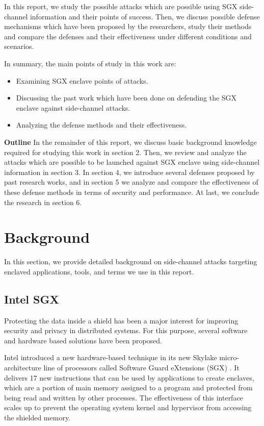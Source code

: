 In this report, we study the possible attacks which are possible using SGX side-channel information and their points of success. Then, we discuss possible defense mechanisms which have been proposed by the researchers, study their methods and compare the defenses and their effectiveness under different conditions and scenarios.

In summary, the main points of study in this work are:
\begin{itemize}
	\item Examining SGX enclave points of attacks.
	\item Discussing the past work which have been done on defending the SGX enclave against side-channel attacks.
	\item Analyzing the defense methods and their effectiveness.
\end{itemize} 
\textbf{Outline} In the remainder of this report, we discuss basic background knowledge required for studying this work in section 2. Then, we review and analyze the attacks which are possible to be launched against SGX enclave using side-channel information in section 3. In section 4, we introduce several defenses proposed by past research works, and in section 5 we analyze and compare the effectiveness of these defense methods in terms of security and performance. At last, we conclude the research in section 6.
\section{Background}
In this section, we provide detailed background on side-channel attacks targeting enclaved applications, tools, and terms we use in this report.

\subsection{Intel SGX}

Protecting the data inside a shield has been a major interest for improving security and privacy in distributed systems. For this purpose, several software and hardware based solutions have been proposed.

Intel introduced a new hardware-based technique in its new Skylake micro-architecture \cite{skylake} line of processors called Software Guard eXtensions (SGX) \cite{sgx}. It delivers 17 new instructions that can be used by applications to create enclaves, which are a portion of main memory assigned to a program and protected from being read and written by other processes. The effectiveness of this interface scales up to prevent the operating system kernel and hypervisor from accessing the shielded memory.

